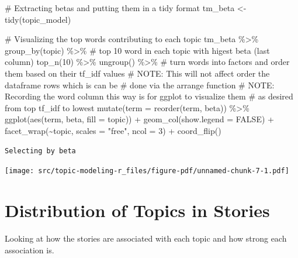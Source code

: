 \documentclass[
  letterpaper,
  DIV=11,
  numbers=noendperiod]{scrreprt}
\newenvironment{Shaded}{\begin{snugshade}}{\end{snugshade}}
\newcommand{\AlertTok}[1]{\textcolor[rgb]{0.68,0.00,0.00}{#1}}
\newcommand{\AttributeTok}[1]{\textcolor[rgb]{0.40,0.45,0.13}{#1}}
\newcommand{\CommentTok}[1]{\textcolor[rgb]{0.37,0.37,0.37}{#1}}
\newcommand{\ConstantTok}[1]{\textcolor[rgb]{0.56,0.35,0.01}{#1}}
\newcommand{\DecValTok}[1]{\textcolor[rgb]{0.68,0.00,0.00}{#1}}
\newcommand{\FunctionTok}[1]{\textcolor[rgb]{0.28,0.35,0.67}{#1}}
\newcommand{\NormalTok}[1]{\textcolor[rgb]{0.00,0.23,0.31}{#1}}
\newcommand{\OtherTok}[1]{\textcolor[rgb]{0.00,0.23,0.31}{#1}}
\newcommand{\SpecialCharTok}[1]{\textcolor[rgb]{0.37,0.37,0.37}{#1}}
\newcommand{\StringTok}[1]{\textcolor[rgb]{0.13,0.47,0.30}{#1}}
\begin{document}
\begin{Shaded}
\begin{Highlighting}[]
\CommentTok{\# Extracting betas and putting them in a tidy format}
\NormalTok{tm\_beta }\OtherTok{\textless{}{-}} \FunctionTok{tidy}\NormalTok{(topic\_model)}

\CommentTok{\# Visualizing the top words contributing to each topic}
\NormalTok{tm\_beta }\SpecialCharTok{\%\textgreater{}\%} 
  \FunctionTok{group\_by}\NormalTok{(topic) }\SpecialCharTok{\%\textgreater{}\%} 
  \CommentTok{\# top 10 word in each topic with higest beta (last column)}
  \FunctionTok{top\_n}\NormalTok{(}\DecValTok{10}\NormalTok{) }\SpecialCharTok{\%\textgreater{}\%} 
  \FunctionTok{ungroup}\NormalTok{() }\SpecialCharTok{\%\textgreater{}\%} 
  \CommentTok{\# turn words into factors and order them based on their tf\_idf values}
  \CommentTok{\# }\AlertTok{NOTE}\CommentTok{: This will not affect order the dataframe rows which is can be}
  \CommentTok{\#   done via the arrange function}
  \CommentTok{\# }\AlertTok{NOTE}\CommentTok{: Recording the word column this way is for ggplot to visualize them}
  \CommentTok{\#   as desired from top tf\_idf to lowest}
  \FunctionTok{mutate}\NormalTok{(}\AttributeTok{term =} \FunctionTok{reorder}\NormalTok{(term, beta)) }\SpecialCharTok{\%\textgreater{}\%} 
  \FunctionTok{ggplot}\NormalTok{(}\FunctionTok{aes}\NormalTok{(term, beta, }\AttributeTok{fill =}\NormalTok{ topic)) }\SpecialCharTok{+}
  \FunctionTok{geom\_col}\NormalTok{(}\AttributeTok{show.legend =} \ConstantTok{FALSE}\NormalTok{) }\SpecialCharTok{+}
  \FunctionTok{facet\_wrap}\NormalTok{(}\SpecialCharTok{\textasciitilde{}}\NormalTok{topic, }\AttributeTok{scales =} \StringTok{"free"}\NormalTok{, }\AttributeTok{ncol =} \DecValTok{3}\NormalTok{) }\SpecialCharTok{+}
  \FunctionTok{coord\_flip}\NormalTok{()}
\end{Highlighting}
\end{Shaded}

\begin{verbatim}
Selecting by beta
\end{verbatim}

\texttt{[image: src/topic-modeling-r\_files/figure-pdf/unnamed-chunk-7-1.pdf]}

\chapter{Distribution of Topics in
Stories}\label{distribution-of-topics-in-stories}

Looking at how the stories are associated with each topic and how strong
each association is.
\end{document}
